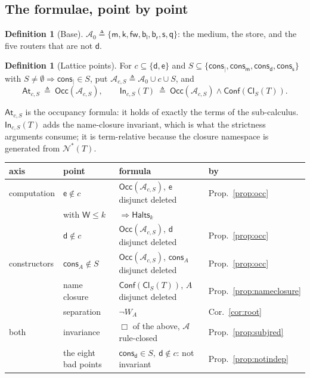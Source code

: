 \documentclass[11pt]{article}
\theoremstyle{plain}
\theoremstyle{definition}
\newtheorem{definition}[theorem]{Definition}
\theoremstyle{remark}
\newcommand{\nms}[1]{\mathcal{N}^{*}(#1)}
\newcommand{\mm}{\mathsf{m}}
\newcommand{\dd}{\mathsf{d}}
\newcommand{\kk}{\mathsf{k}}
\newcommand{\fw}{\mathsf{fw}}
\newcommand{\bl}{\mathsf{b}_{\mathsf{l}}}
\newcommand{\br}{\mathsf{b}_{\mathsf{r}}}
\newcommand{\sy}{\mathsf{s}}
\newcommand{\ev}{\mathsf{e}}
\newcommand{\qq}{\mathsf{q}}
\newcommand{\cons}{\mathsf{cons}}
\newcommand{\consp}{\cons_{\mid}}
\newcommand{\consm}{\cons_{\mm}}
\newcommand{\consd}{\cons_{\dd}}
\newcommand{\conss}{\cons_{\sy}}
\newcommand{\Occ}{\mathsf{Occ}}
\newcommand{\Conf}{\mathsf{Conf}}
\newcommand{\Cl}{\mathsf{Cl}}
\newcommand{\Atm}{\mathcal{A}}
\newcommand{\Wt}{\mathsf{W}}
\begin{document}
\subsection{The formulae, point by point}

\begin{definition}[Base]
$\Atm_{0} \triangleq \{\mm,\kk,\fw,\bl,\br,\sy,\qq\}$: the medium, the store,
and the five routers that are not $\dd$.
\end{definition}

\begin{definition}[Lattice points]
\label{def:points}
For $c \subseteq \{\dd,\ev\}$ and $S \subseteq \{\consp,\consm,\consd,\conss\}$
with $S \neq \emptyset \Rightarrow \consp \in S$, put
$\Atm_{c,S} \triangleq \Atm_{0} \cup c \cup S$, and
\[
  \mathsf{At}_{c,S} \ \triangleq\ \Occ(\Atm_{c,S}),
  \qquad
  \mathsf{In}_{c,S}(T) \ \triangleq\
  \Occ(\Atm_{c,S}) \wedge \Conf(\Cl_{S}(T)) .
\]
\end{definition}

$\mathsf{At}_{c,S}$ is the occupancy formula: it holds of exactly the terms of
the sub-calculus. $\mathsf{In}_{c,S}(T)$ adds the name-closure invariant, which
is what the strictness arguments consume; it is term-relative because the
closure namespace is generated from $\nms{T}$.

\begin{center}
\begin{tabular}{@{}llll@{}}
\toprule
axis & point & formula & by\\
\midrule
computation & $\ev \notin c$ & $\Occ(\Atm_{c,S})$, $\ev$ disjunct deleted
  & Prop.~\ref{prop:occ}\\
 & with $\Wt \leq k$ & $\Rightarrow \mathsf{Halts}_{k}$
  & \cite[Prop.~9.9]{rhocomb3}\\
 & $\dd \notin c$ & $\Occ(\Atm_{c,S})$, $\dd$ disjunct deleted
  & Prop.~\ref{prop:occ}\\
\midrule
constructors & $\cons_{A} \notin S$ & $\Occ(\Atm_{c,S})$, $\cons_{A}$ disjunct
  deleted & Prop.~\ref{prop:occ}\\
 & name closure & $\Conf(\Cl_{S}(T))$, $A$ disjunct deleted
  & Prop.~\ref{prop:nameclosure}\\
 & separation & $\neg W_{A}$ & Cor.~\ref{cor:root}\\
\midrule
both & invariance & $\Box$ of the above, $\Atm$ rule-closed
  & Prop.~\ref{prop:subjred}\\
 & the eight bad points & $\consd \in S,\ \dd \notin c$: not invariant
  & Prop.~\ref{prop:notindep}\\
\bottomrule
\end{tabular}
\end{center}
\end{document}
